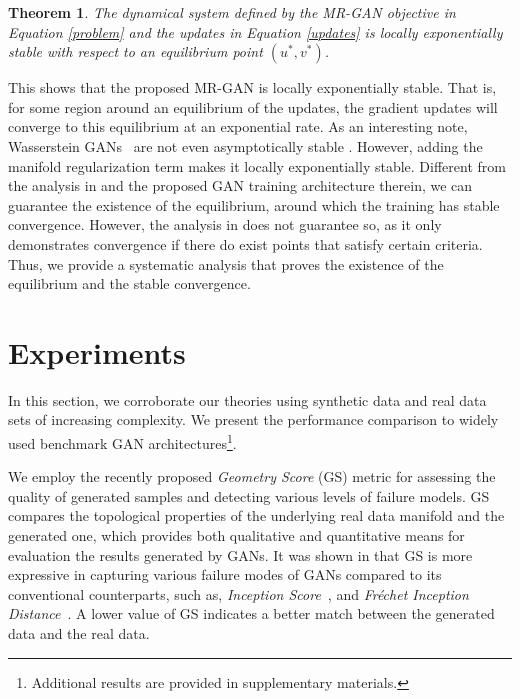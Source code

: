 \documentclass[10pt,twocolumn,letterpaper]{article}
\newcommand{\J}{\mathbf{J}}
\newtheorem{thm}{Theorem}
\begin{document}
\begin{thm}\label{thm_stable}
	The dynamical system defined by the MR-GAN objective in Equation \eqref{problem} and the updates in
	Equation \eqref{updates} is locally exponentially stable with respect to an equilibrium point $(u^\ast, v^\ast)$.
\end{thm}
This shows that the proposed MR-GAN is locally exponentially stable. That is, for some region around an equilibrium of the updates, the gradient updates will converge
to this equilibrium at an exponential rate. As an interesting note, Wasserstein GANs~\cite{arjovsky2017wasserstein} are not even asymptotically stable \cite{nagarajan2017gradient}. However, adding the manifold regularization term makes it locally exponentially stable.
Different from the analysis in \cite{nagarajan2017gradient} and the proposed GAN training architecture therein, we can guarantee the existence of the equilibrium, around which the training has stable convergence. However, the analysis in \cite{nagarajan2017gradient} does not guarantee so, as it only demonstrates convergence if there do exist points that satisfy certain criteria. Thus, we provide a systematic analysis that proves the existence of the equilibrium and the stable convergence.


\section{Experiments}
In this section, we corroborate our theories using synthetic data
and real data sets of increasing complexity. We present the performance comparison to widely used benchmark GAN architectures\footnote{Additional results are provided in supplementary materials.}. 

We employ the recently proposed {\emph{Geometry Score} (GS)} metric \cite{khrulkov2018geometry} for assessing the quality of generated samples and detecting various levels of failure models. GS compares the topological properties of the underlying real data manifold and the generated
one, which provides both qualitative and quantitative means for evaluation the results generated by GANs. It was shown in \cite{khrulkov2018geometry} that GS is more expressive in capturing various failure modes of GANs compared to its conventional counterparts, such as, \emph{Inception Score}~\cite{salimans2016improved}, and \emph{Fr\'echet Inception Distance}~\cite{heusel2017gans}. A lower value of GS indicates a better match between the generated data and the real data.
\end{document}
